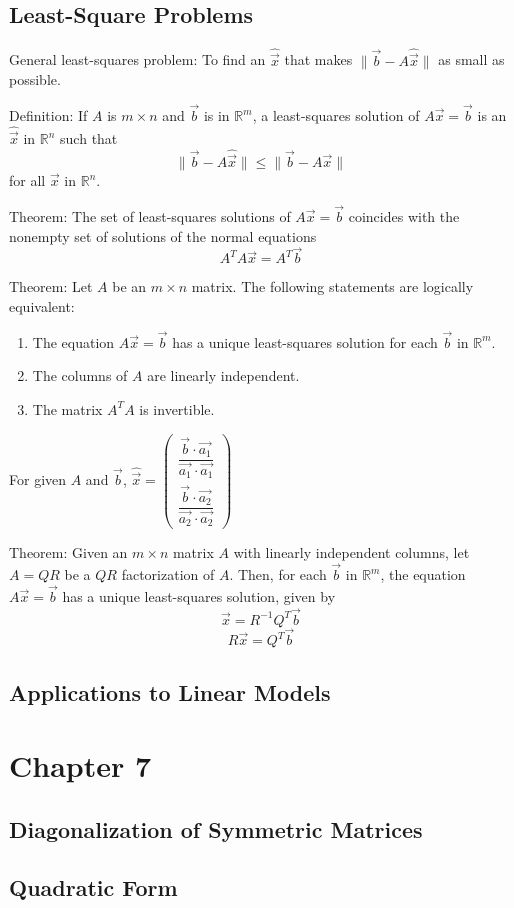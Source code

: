 \documentclass[12pt]{article}
\newcommand\norm[1]{\lVert#1\rVert}
\begin{document}
\subsection{Least-Square Problems}
General least-squares problem: To find an $\hat{\vec{x}}$ that makes $\norm{\vec{b}- A\hat{\vec{x}}}$ as small as possible.

Definition: If $A$ is $m\times n$ and $\vec{b}$ is in $\mathbb{R}^m$, a least-squares solution of $A\vec{x} = \vec{b}$ is an $\hat{\vec{x}}$ in $\mathbb{R}^n$ such that $$\norm{\vec{b}- A\hat{\vec{x}}} \leq \norm{\vec{b}- A\vec{x}}$$
for all $\vec{x}$ in $\mathbb{R}^n$.

Theorem: The set of least-squares solutions of $A\vec{x} = \vec{b}$ coincides with the nonempty set of solutions of the normal equations $$A^TA\vec{x} = A^T\vec{b}$$

Theorem: Let $A$ be an $m\times n$ matrix. The following statements are logically equivalent:
\begin{enumerate}
    \item The equation $A\vec{x} = \vec{b}$ has a unique least-squares solution for each $\vec{b}$ in $\mathbb{R}^m$.
    \item The columns of $A$ are linearly independent.
    \item The matrix $A^TA$ is invertible.
\end{enumerate}


For given $A$ and $\vec{b}$, $\hat{\vec{x}} = \begin{pmatrix}
    \dfrac{\vec{b}\cdot\vec{a_1}}{\vec{a_1}\cdot\vec{a_1}} \\
    \dfrac{\vec{b}\cdot\vec{a_2}}{\vec{a_2}\cdot\vec{a_2}}
\end{pmatrix}$

Theorem: Given an $m\times n$ matrix $A$ with linearly independent columns, let $A = QR$ be a $QR$ factorization of $A$. Then, for each $\vec{b}$ in $\mathbb{R}^m$, the equation $A\vec{x} = \vec{b}$ has a unique least-squares solution, given by $$\hat{\vec{x}} = R^{-1}Q^T\vec{b}$$
$$R\vec{x} = Q^T\vec{b}$$




\subsection{Applications to Linear Models}



\section{Chapter 7}
\subsection{Diagonalization of Symmetric Matrices}
\subsection{Quadratic Form}
\end{document}
